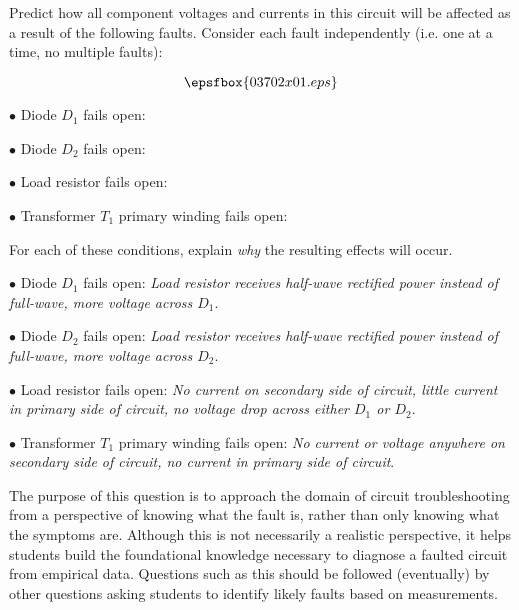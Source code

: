 

Predict how all component voltages and currents in this circuit will be affected as a result of the following faults.  Consider each fault independently (i.e. one at a time, no multiple faults):

$$\epsfbox{03702x01.eps}$$

\medskip
\item{$\bullet$} Diode $D_1$ fails open:
\vskip 5pt
\item{$\bullet$} Diode $D_2$ fails open:
\vskip 5pt
\item{$\bullet$} Load resistor fails open:
\vskip 5pt
\item{$\bullet$} Transformer $T_1$ primary winding fails open:
\medskip

For each of these conditions, explain {\it why} the resulting effects will occur.







\medskip
\item{$\bullet$} Diode $D_1$ fails open: {\it Load resistor receives half-wave rectified power instead of full-wave, more voltage across $D_1$}.
\vskip 5pt
\item{$\bullet$} Diode $D_2$ fails open: {\it Load resistor receives half-wave rectified power instead of full-wave, more voltage across $D_2$}.
\vskip 5pt
\item{$\bullet$} Load resistor fails open: {\it No current on secondary side of circuit, little current in primary side of circuit, no voltage drop across either $D_1$ or $D_2$}.
\vskip 5pt
\item{$\bullet$} Transformer $T_1$ primary winding fails open: {\it No current or voltage anywhere on secondary side of circuit, no current in primary side of circuit}.
\medskip







The purpose of this question is to approach the domain of circuit troubleshooting from a perspective of knowing what the fault is, rather than only knowing what the symptoms are.  Although this is not necessarily a realistic perspective, it helps students build the foundational knowledge necessary to diagnose a faulted circuit from empirical data.  Questions such as this should be followed (eventually) by other questions asking students to identify likely faults based on measurements.




